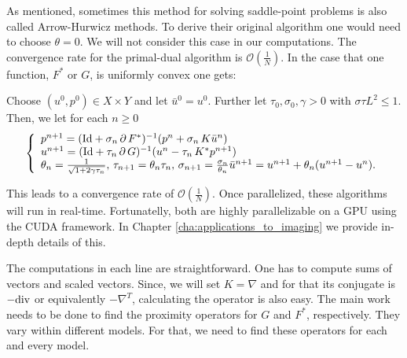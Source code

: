     As mentioned, sometimes this method for solving saddle-point problems is also called Arrow-Hurwicz methods. To derive their original algorithm one would need to choose $\theta = 0$. We will not consider this case in our computations. The convergence rate for the primal-dual algorithm is $\mathcal{O}(\frac{1}{N})$. In the case that one function, $F^{\ast}$ or $G$, is uniformly convex one gets:

    \begin{algorithm}
    \label{alg:f_star_or_g_uniformly_convex}
        Choose $(u^{0}, p^{0}) \in X \times Y$ and let $\bar{u}^{0} = u^{0}$. Further let $\tau_{0}, \sigma_{0}, \gamma > 0$ with $\sigma\tau L^{2} \le 1$. Then, we let for each $n \ge 0$
            \begin{equation}
                \left\{ 
                    \begin{array}{l l}
                        p^{n+1} = (\textnormal{Id} + \sigma_{n}\,\partial\,F^{\ast})^{-1}(p^{n} + \sigma_{n}\,K\bar{u}^{n}) \\
                        u^{n+1} = (\textnormal{Id} + \tau_{n}\,\partial\,G)^{-1}(u^{n} - \tau_{n}\,K^{\ast}p^{n+1}) \\
                        \theta_{n} = \frac{1}{\sqrt{1 + 2\gamma\tau_{n}}}, \, \tau_{n+1} = \theta_{n}\tau_{n}, \, \sigma_{n+1} = \frac{\sigma_{n}}{\theta_{n}}
                        \bar{u}^{n+1} = u^{n+1} + \theta_{n} (u^{n+1} - u^{n}).
                    \end{array}
                \right.
            \label{eq:f_star_or_g_uniformly_convex}
            \end{equation}
    \end{algorithm}

    This leads to a convergence rate of $\mathcal{O}(\frac{1}{N})$. Once parallelized, these algorithms will run in real-time. Fortunatelly, both are highly parallelizable on a GPU using the CUDA framework. In Chapter \ref{cha:applications_to_imaging} we provide in-depth details of this.

    The computations in each line are straightforward. One has to compute sums of vectors and scaled vectors. Since, we will set $K = \nabla$ and for that its conjugate is $-\textnormal{div}$ or equivalently $- \nabla^{T}$, calculating the operator is also easy. The main work needs to be done to find the proximity operators for $G$ and $F^{\ast}$, respectively. They vary within different models. For that, we need to find these operators for each and every model.

